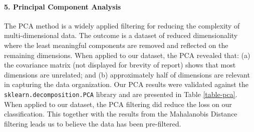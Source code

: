 \documentclass[fleqn,9 pt]{SelfArx} %
\begin{document}
\begin{sloppypar}
\paragraph{5. Principal Component Analysis} The PCA method \cite{jolliffe2002principal} is a widely applied filtering for reducing the complexity of multi-dimensional data. The outcome is a dataset of reduced dimensionality where the least meaningful components are removed and reflected on the remaining dimensions. When applied to our dataset, the PCA revealed that: (a) the covariance matrix (not displayed for brevity of report) shows that most dimensions are unrelated; and (b) approximately half of dimensions are relevant in capturing the data organization. Our PCA results were validated against the \texttt{sklearn.decomposition.PCA} library and are presented in Table \ref{table-pca}. When applied to our dataset, the PCA filtering did reduce the loss on our classification. This together with the results from the Mahalanobis Distance filtering leads us to believe the data has been pre-filtered. 

\begin{table}
\begin{scriptsize}
\begin{center}


\end{center}
\end{scriptsize}
\end{table}
\end{sloppypar}
\end{document}
